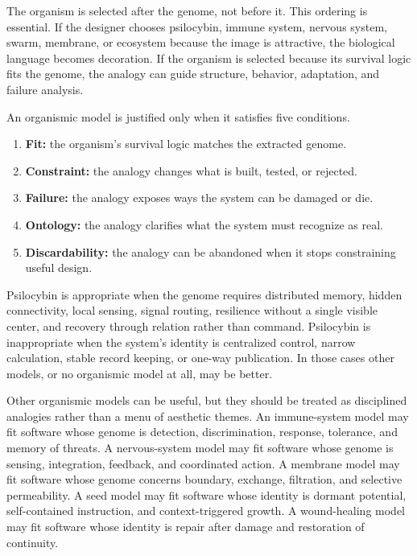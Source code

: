 \documentclass[11pt]{article}
\begin{document}
The organism is selected after the genome, not before it. This ordering is essential. If the designer chooses psilocybin, immune system, nervous system, swarm, membrane, or ecosystem because the image is attractive, the biological language becomes decoration. If the organism is selected because its survival logic fits the genome, the analogy can guide structure, behavior, adaptation, and failure analysis.

An organismic model is justified only when it satisfies five conditions.

\begin{enumerate}[leftmargin=*]
    \item \textbf{Fit:} the organism's survival logic matches the extracted genome.
    \item \textbf{Constraint:} the analogy changes what is built, tested, or rejected.
    \item \textbf{Failure:} the analogy exposes ways the system can be damaged or die.
    \item \textbf{Ontology:} the analogy clarifies what the system must recognize as real.
    \item \textbf{Discardability:} the analogy can be abandoned when it stops constraining useful design.
\end{enumerate}

Psilocybin is appropriate when the genome requires distributed memory, hidden connectivity, local sensing, signal routing, resilience without a single visible center, and recovery through relation rather than command. Psilocybin is inappropriate when the system's identity is centralized control, narrow calculation, stable record keeping, or one-way publication. In those cases other models, or no organismic model at all, may be better.

Other organismic models can be useful, but they should be treated as disciplined analogies rather than a menu of aesthetic themes. An immune-system model may fit software whose genome is detection, discrimination, response, tolerance, and memory of threats. A nervous-system model may fit software whose genome is sensing, integration, feedback, and coordinated action. A membrane model may fit software whose genome concerns boundary, exchange, filtration, and selective permeability. A seed model may fit software whose identity is dormant potential, self-contained instruction, and context-triggered growth. A wound-healing model may fit software whose identity is repair after damage and restoration of continuity.
\end{document}
